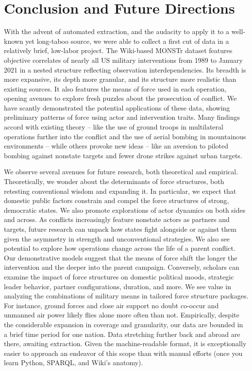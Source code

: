 \documentclass[fleqn,12pt]{article}
\begin{document}
\section*{Conclusion and Future Directions}
With the advent of automated extraction, and the audacity to apply it to a well-known yet long-taboo source, we were able to collect a first cut of data in a relatively brief, low-labor project. The Wiki-based MONSTr dataset features objective correlates of nearly all US military interventions from 1989 to January 2021 in a nested structure reflecting observation interdependencies. Its breadth is more expansive, its depth more granular, and its structure more realistic than existing sources. It also features the means of force used in each operation, opening avenues to explore fresh puzzles about the prosecution of conflict. We have scantly demonstrated the potential applications of these data, showing preliminary patterns of force using actor and intervention traits. Many findings accord with existing theory -- like the use of ground troops in multilateral operations further into the conflict and the use of aerial bombing in mountainous environments -- while others provoke new ideas -- like an aversion to piloted bombing against nonstate targets and fewer drone strikes against urban targets.

We observe several avenues for future research, both theoretical and empirical. Theoretically, we wonder about the determinants of force structures, both retesting conventional wisdom and expanding it. In particular, we expect that domestic public factors constrain and compel the force structures of strong, democratic states. We also promote explorations of actor dynamics on both sides and across. As conflicts increasingly feature nonstate actors as partners and targets, future research can unpack how states fight alongside or against them given the asymmetry in strength and unconventional strategies. We also see potential to explore how operations change across the life of a parent conflict. Our demonstrative models suggest that the means of force shift the longer the intervention and the deeper into the parent campaign. Conversely, scholars can examine the impact of force structures on domestic political moods, strategic leader behavior, partner configurations, duration, and more. We see value in analyzing the combinations of military means in tailored force structure packages. For instance, ground forces and close air support no doubt co-occur and unmanned air power likely flies alone more often than not. Empirically, despite the considerable expansion in coverage and granularity, our data are bounded in a brief time period for one nation. Data stretching further back and abroad are there, awaiting extraction. Given the machine-readable format, it is exceptionally easier to approach an endeavor of this scope than with manual efforts (once you learn Python, SPARQL, and Wiki's anatomy). 
\end{document}

